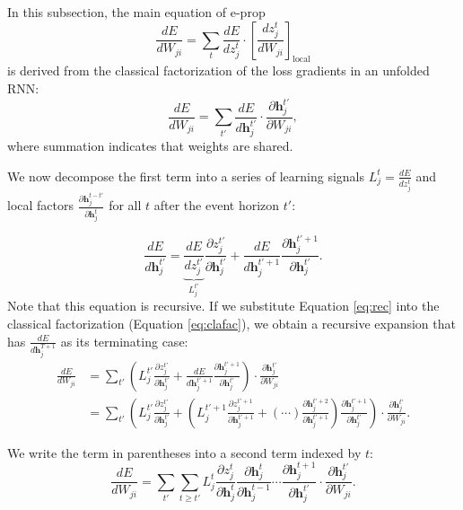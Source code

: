         In this subsection, the main equation of e-prop
        \begin{equation}
        \frac{dE}{dW_{ji}} =
        \sum_t\frac{dE}{dz_j^t}\cdot\left[\frac{dz_j^t}{dW_{ji}}\right]_\text{local}
        \end{equation}
        is derived from the classical factorization of the loss gradients in an unfolded RNN:
        \begin{equation}\label{eq:clafac}
        \frac{dE}{dW_{ji}} = \sum_{t'}\frac{dE}{d\mathbf{h}_j^{t'}}\cdot\frac{\partial \mathbf{h}_j^{t'}}{\partial W_{ji}},
        \end{equation}
        where summation indicates that weights are shared.

        We now decompose the first term into a series of learning signals $L_j^t = \frac{dE}{dz_j^t}$ and local factors $\frac{\partial\mathbf{h}_j^{t-t'}}{\partial\mathbf{h}_j^t}$ for all $t$ after the event horizon $t'$:

        \begin{equation}\label{eq:rec}
        \frac{dE}{d\mathbf{h}_j^{t'}} = \underbrace{\frac{dE}{dz_j^{t'}}}_{L^{t'}_j} \frac{\partial z_j^{t'}}{\partial\mathbf{h}_j^{t'}} + \frac{dE}{d\mathbf{h}_j^{t'+1}}\frac{\partial\mathbf{h}_j^{t'+1}}{\partial\mathbf{h}_j^{t'}}.
        \end{equation}
        Note that this equation is recursive.
        If we substitute Equation \ref{eq:rec} into the classical factorization (Equation \ref{eq:clafac}), we obtain a recursive expansion that has $\frac{dE}{d\mathbf{h}^{T+1}_j}$ as its terminating case:
        \begin{align}
        \frac{dE}{dW_{ji}} &= \sum_{t'}\left(L_j^{t'}\frac{\partial z_j^{t'}}{\partial\mathbf{h}_j^{t'}} + \frac{dE}{d\mathbf{h}_j^{t'+1}}\frac{\partial\mathbf{h}_j^{t'+1}}{\partial\mathbf{h}_j^{t'}}\right)\cdot\frac{\partial\mathbf{h}_j^{t'}}{\partial W_{ji}}\\
        &= \sum_{t'}\left(L_j^{t'}\frac{\partial z_j^{t'}}{\partial\mathbf{h}_j^{t'}} + \left( L^{t'+1}_j \frac{\partial z_j^{t'+1}}{\partial\mathbf{h}_j^{t'+1}} + (\cdots)\frac{\partial\mathbf{h}_j^{t'+2}}{\partial\mathbf{h}_j^{t'+1}}  \right) \frac{\partial\mathbf{h}_j^{t'+1}}{\partial\mathbf{h}_j^{t'}}\right)\cdot\frac{\partial\mathbf{h}_j^{t'}}{\partial W_{ji}}.
        \end{align}

        We write the term in parentheses into a second term indexed by $t$:
        \begin{equation}
        \frac{dE}{dW_{ji}} = \sum_{t'}\sum_{t\geq t'}L^t_j\frac{\partial z_j^t}{\partial\mathbf{h}_j^t}\frac{\partial\mathbf{h}^t_j}{\partial\mathbf{h}_j^{t-1}} \cdots \frac{\partial\mathbf{h}_j^{t+1}}{\partial\mathbf{h}_j^{t'}}\cdot\frac{\partial\mathbf{h}_j^{t'}}{\partial W_{ji}}.
        \end{equation}

